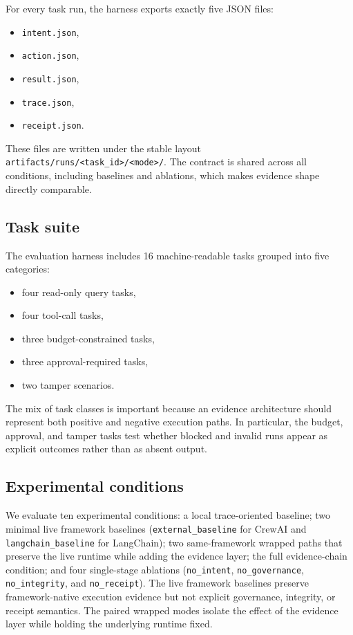 For every task run, the harness exports exactly five JSON files:

\begin{itemize}
  \item \texttt{intent.json},
  \item \texttt{action.json},
  \item \texttt{result.json},
  \item \texttt{trace.json},
  \item \texttt{receipt.json}.
\end{itemize}

These files are written under the stable layout \texttt{artifacts/runs/<task\_id>/<mode>/}. The contract is shared across all conditions, including baselines and ablations, which makes evidence shape directly comparable.

\subsection{Task suite}

The evaluation harness includes 16 machine-readable tasks grouped into five categories:

\begin{itemize}
  \item four read-only query tasks,
  \item four tool-call tasks,
  \item three budget-constrained tasks,
  \item three approval-required tasks,
  \item two tamper scenarios.
\end{itemize}

The mix of task classes is important because an evidence architecture should represent both positive and negative execution paths. In particular, the budget, approval, and tamper tasks test whether blocked and invalid runs appear as explicit outcomes rather than as absent output.

\subsection{Experimental conditions}

We evaluate ten experimental conditions: a local trace-oriented baseline; two minimal live framework baselines (\texttt{external\_baseline} for CrewAI and \texttt{langchain\_baseline} for LangChain); two same-framework wrapped paths that preserve the live runtime while adding the evidence layer; the full evidence-chain condition; and four single-stage ablations (\texttt{no\_intent}, \texttt{no\_governance}, \texttt{no\_integrity}, and \texttt{no\_receipt}). The live framework baselines preserve framework-native execution evidence but not explicit governance, integrity, or receipt semantics. The paired wrapped modes isolate the effect of the evidence layer while holding the underlying runtime fixed.


